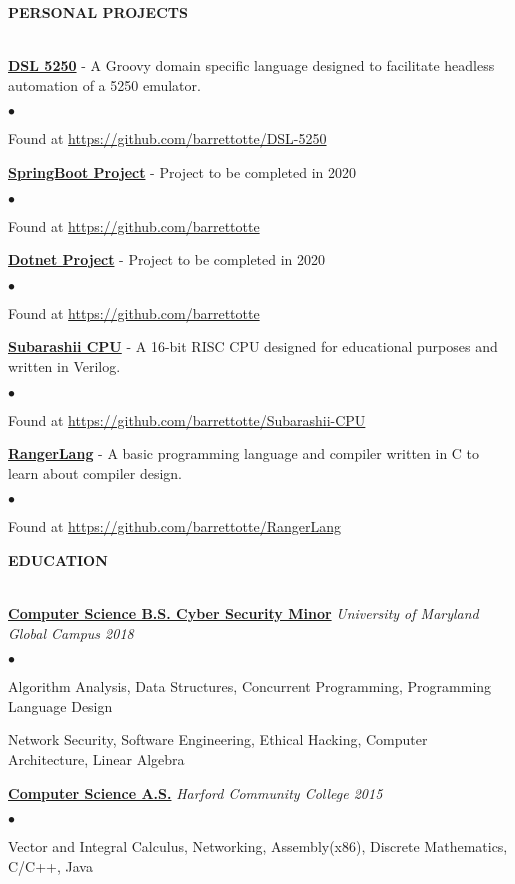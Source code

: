 \documentclass{article}
\newcommand{\lineunder}{
	\vspace*{-4pt}\\ 
	\hspace*{-18pt}\hrulefill \\
}
\newcommand{\header}[1]{
	{\hspace*{-15pt}\vspace*{6pt}\textsc{#1}}\vspace*{-6pt}\lineunder
}
\newcommand{\project}[2]{
	{\textbf{\underline{#1}} - #2{\hfill}\vspace*{3pt}}
}
\newcommand{\education}[2]{
	\textbf{\underline{{#1}}} \textit{#2}\vspace*{3pt}
}
\newenvironment{resumecontent}{
	\begin{list}
		{\small$\bullet$}{\topsep 0pt \itemsep -2pt}}{\vspace*{4pt}
	\end{list}
}
\newcommand{\resumeheader}[1]{
	\vspace*{10pt}
	\header{\textbf{#1}}
    \vspace*{5pt}
}
\begin{document}
	\resumeheader{PERSONAL PROJECTS}
		\project
			{DSL 5250}
			{A Groovy domain specific language designed to facilitate headless automation of a 5250 emulator.}
			\begin{resumecontent}
				\item Found at \href{https://github.com/barrettotte/DSL-5250}
					{https://github.com/barrettotte/DSL-5250}
			\end{resumecontent}
            \vspace*{3pt}
        \project
            {SpringBoot Project}
            {Project to be completed in 2020}
            \begin{resumecontent}
				\item Found at \href{https://github.com/barrettotte}
					{https://github.com/barrettotte}
			\end{resumecontent}
            \vspace*{3pt}
        \project
            {Dotnet Project}
            {Project to be completed in 2020}
            \begin{resumecontent}
				\item Found at \href{https://github.com/barrettotte}
					{https://github.com/barrettotte}
			\end{resumecontent}
            \vspace*{3pt}
		\project
			{Subarashii CPU}
			{A 16-bit RISC CPU designed for educational purposes and written in Verilog.}
            \begin{resumecontent}
				\item Found at \href{https://github.com/barrettotte/Subarashii-CPU}
					{https://github.com/barrettotte/Subarashii-CPU}
			\end{resumecontent}
            \vspace*{3pt}
		\project
			{RangerLang}
			{A basic programming language and compiler written in C to learn about compiler design.}
            \begin{resumecontent}
				\item Found at \href{https://github.com/barrettotte/RangerLang}
					{https://github.com/barrettotte/RangerLang}
			\end{resumecontent}

	\resumeheader{EDUCATION}
		\education {Computer Science B.S. Cyber Security Minor}{University of Maryland Global Campus 2018}
            \begin{resumecontent}
                \item Algorithm Analysis, Data Structures, Concurrent Programming, Programming Language Design
                \item Network Security, Software Engineering, Ethical Hacking, Computer Architecture, Linear Algebra
            \end{resumecontent}
            \vspace*{3pt}
		\education {Computer Science A.S.}{Harford Community College 2015}
            \begin{resumecontent}
                \item Vector and Integral Calculus, Networking, Assembly(x86), Discrete Mathematics, C/C++, Java
            \end{resumecontent}
\end{document}
